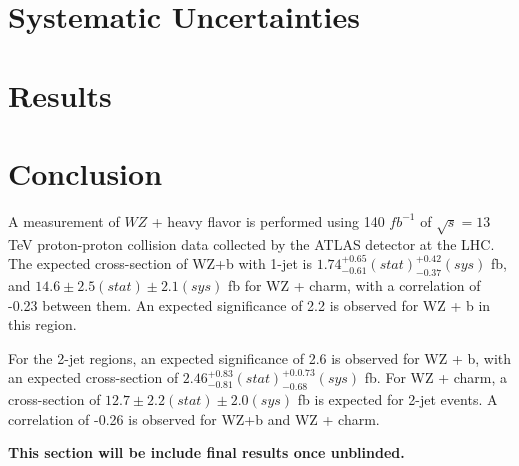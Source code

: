\documentclass[NOTE, atlasdraft=true, texlive=2016, UKenglish]{\ATLASLATEXPATH atlasdoc}
\begin{document}
\section{Systematic Uncertainties}
\label{sec:sys}


\section{Results}
\label{sec:results}



\section{Conclusion}
\label{sec:conclusion}

A measurement of $WZ$ + heavy flavor is performed using 140 $fb^{-1}$ of $\sqrt{s} = 13$ TeV proton-proton collision data collected by the ATLAS detector at the LHC. The expected cross-section of WZ+b with 1-jet is $1.74^{+0.65}_{-0.61}(stat)^{+0.42}_{-0.37}(sys)$ fb, and $14.6 \pm 2.5 (stat) \pm 2.1 (sys)$ fb for WZ + charm, with a correlation of -0.23 between them. An expected significance of 2.2 is observed for WZ + b in this region.

For the 2-jet regions, an expected significance of 2.6 is observed for WZ + b, with an expected cross-section of $2.46^{+0.83}_{-0.81}(stat)^{+0.0.73}_{-0.68}(sys)$ fb. For WZ + charm, a cross-section of $12.7 \pm 2.2 (stat) \pm 2.0 (sys)$ fb is expected for 2-jet events. A correlation of -0.26 is observed for WZ+b and WZ + charm.

\textbf{This section will be include final results once unblinded.}%

\printbibliography
%
%
\end{document}
